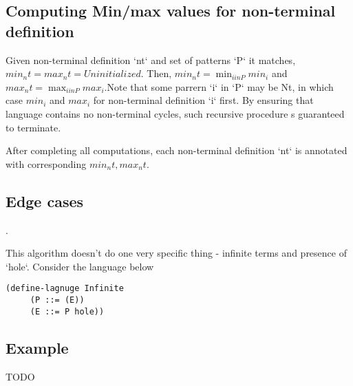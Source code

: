 \subsection{Computing Min/max values for non-terminal definition}

Given non-terminal definition `nt` and set of patterns `P` it matches, $min_nt = max_nt = Uninitialized$. Then, $min_nt = \min_{i in P} min_i$ and $max_nt = \max_{i in P} max_i$.Note that some parrern `i` in `P` may be Nt, in which case $min_i$ and $max_i$ for non-terminal definition `i` first. By ensuring that language contains no non-terminal cycles, such recursive procedure s guaranteed to terminate.

After completing all computations, each non-terminal definition `nt` is annotated with corresponding $min_nt, max_nt$.


\subsection{Edge cases}.

This algorithm doesn't do one very specific thing - infinite terms and presence of `hole`. Consider the language below

\begin{lstlisting}
(define-lagnuge Infinite
     (P ::= (E))
     (E ::= P hole))
\end{lstlisting}

\subsection{Example}
TODO
